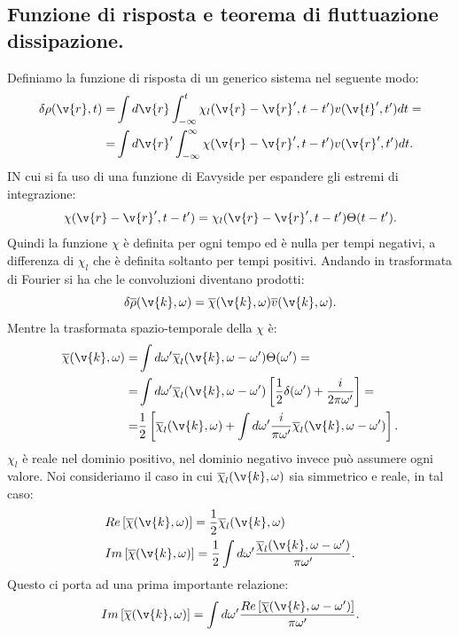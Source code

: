 \subsection{Funzione di risposta e teorema di fluttuazione dissipazione.}%
\label{sub:Funzione di risposta e teorema di fluttuazione dissipazione.}
Definiamo la funzione di risposta di un generico sistema nel seguente modo:
\[\begin{aligned}
    \delta\rho (\v{r}, t) =&
    \int d\v{r}\int_{-\infty}^{t}\chi_l(\v{r}-\v{r}',t-t')v(\v{t}',t')dt=\\ 
    =&
    \int d\v{r}'\int_{-\infty}^{\infty}\chi(\v{r}-\v{r}', t-t') v(\v{r}',t')dt
.\end{aligned}\]
IN cui si fa uso di una funzione di Eavyside per espandere gli estremi di integrazione:
\[
    \chi(\v{r}-\v{r}', t-t') =\chi_l(\v{r}-\v{r}',t-t')\Theta (t-t') 
.\] 
Quindi la funzione $\chi$ è definita per ogni tempo ed è nulla per tempi negativi, a differenza di $\chi_l$ che è definita soltanto per tempi positivi. Andando in trasformata di Fourier si ha che le convoluzioni diventano prodotti:
\[
    \delta\overline{\rho}(\v{k},\omega) 
    = \overline{\chi}(\v{k},\omega) \overline{v}(\v{k},\omega) 
.\] 
Mentre la trasformata spazio-temporale della $\chi$ è:
\[\begin{aligned}
    \overline{\chi}(\v{k},\omega) =&
    	\int d\omega' \overline{\chi}_l(\v{k},\omega-\omega')\Theta (\omega')=\\
    =&
	\int d\omega' \overline{\chi}_l(\v{k},\omega-\omega')
	\left[\frac{1}{2}\delta (\omega') + \frac{i}{2\pi\omega'}\right]=\\
    =&
    	\frac{1}{2}\left[\overline{\chi}_l(\v{k},\omega) + 
    	\int d\omega' \frac{i}{\pi\omega'} 
	\overline{\chi}_l(\v{k},\omega-\omega') \right]
.\end{aligned}\]
$\chi_l$ è reale nel dominio positivo, nel dominio negativo invece può assumere ogni valore. Noi consideriamo il caso in cui $ \overline{\chi}_l(\v{k},\omega)$ sia simmetrico e reale, in tal caso:
\[\begin{aligned}
    &Re\left[ \overline{\chi}(\v{k},\omega)\right] =
    \frac{1}{2}\overline{\chi}_l(\v{k},\omega) \\
    &Im\left[ \overline{\chi}(\v{k},\omega)\right] =
    \frac{1}{2}\int d\omega' 
    \frac{\overline{\chi}_l(\v{k},\omega-\omega')}{\pi\omega'}
.\end{aligned}\]
Questo ci porta ad una prima importante relazione:
\[
    Im\left[\overline{\chi}(\v{k},\omega)\right]=
    \int d\omega' 
    \frac{Re\left[\overline{\chi}(\v{k},\omega-\omega')\right]}{\pi\omega'}
.\] 

